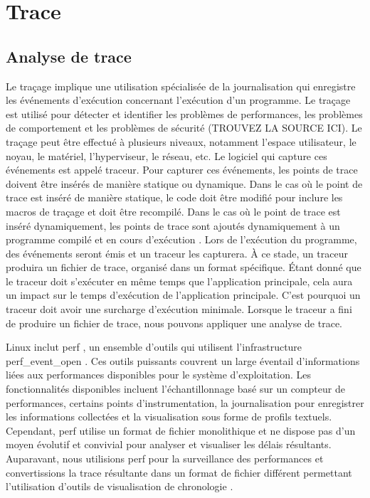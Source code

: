 \label{sec:RevLitt}

\section{Trace}

\subsection{Analyse de trace}



Le traçage implique une utilisation spécialisée de la journalisation qui enregistre les événements d'exécution concernant l'exécution d'un programme. Le traçage est utilisé pour détecter et identifier les problèmes de performances, les problèmes de comportement et les problèmes de sécurité (TROUVEZ LA SOURCE ICI). Le traçage peut être effectué à plusieurs niveaux, notamment l'espace utilisateur, le noyau, le matériel, l'hyperviseur, le réseau, etc. Le logiciel qui capture ces événements est appelé traceur. Pour capturer ces événements, les points de trace doivent être insérés de manière statique ou dynamique. Dans le cas où le point de trace est inséré de manière statique, le code doit être modifié pour inclure les macros de traçage et doit être recompilé. Dans le cas où le point de trace est inséré dynamiquement, les points de trace sont ajoutés dynamiquement à un programme compilé et en cours d'exécution \cite{gregg2011dtrace}. Lors de l'exécution du programme, des événements seront émis et un traceur les capturera. À ce stade, un traceur produira un fichier de trace, organisé dans un format spécifique. Étant donné que le traceur doit s'exécuter en même temps que l'application principale, cela aura un impact sur le temps d'exécution de l'application principale. C'est pourquoi un traceur doit avoir une surcharge d'exécution minimale. Lorsque le traceur a fini de produire un fichier de trace, nous pouvons appliquer une analyse de trace.

Linux inclut perf \cite{kernelPerfWiki}, un ensemble d'outils qui utilisent l'infrastructure perf\_event\_open \cite{man7Perf}. Ces outils puissants couvrent un large éventail d'informations liées aux performances disponibles pour le système d'exploitation. Les fonctionnalités disponibles incluent l'échantillonnage basé sur un compteur de performances, certains points d'instrumentation, la journalisation pour enregistrer les informations collectées et la visualisation sous forme de profils textuels. Cependant, perf utilise un format de fichier monolithique et ne dispose pas d'un moyen évolutif et convivial pour analyser et visualiser les délais résultants. Auparavant, nous utilisions perf pour la surveillance des performances et convertissions la trace résultante dans un format de fichier différent permettant l'utilisation d'outils de visualisation de chronologie \cite{schone2014scalable}.




